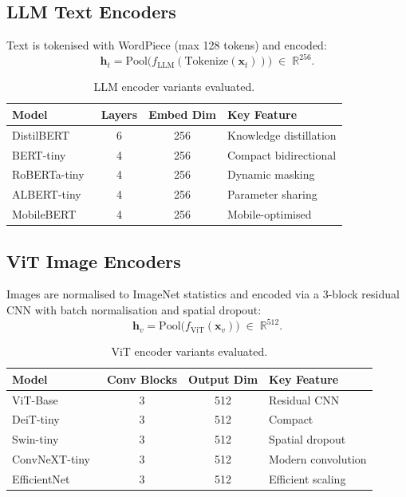 \documentclass[12pt, a4paper, oneside]{Thesis}
\begin{document}
\subsection{LLM Text Encoders}
Text is tokenised with WordPiece \cite{Devlin2019} (max 128 tokens) and encoded:
\[
  \mathbf{h}_t = \mathrm{Pool}\!\bigl(f_{\mathrm{LLM}}(\mathrm{Tokenize}(\mathbf{x}_t))\bigr) \;\in\; \mathbb{R}^{256}.
\]

\begin{table}[H]\centering
\small
\begin{tabular}{lccl}
\toprule
\textbf{Model} & \textbf{Layers} & \textbf{Embed Dim} & \textbf{Key Feature}\\
\midrule
DistilBERT~\cite{Sanh2019}    & 6 & 256 & Knowledge distillation \\
BERT-tiny~\cite{Devlin2019}   & 4 & 256 & Compact bidirectional \\
RoBERTa-tiny~\cite{Liu2019}   & 4 & 256 & Dynamic masking \\
ALBERT-tiny~\cite{Lan2020}    & 4 & 256 & Parameter sharing \\
MobileBERT~\cite{Sun2020}     & 4 & 256 & Mobile-optimised \\
\bottomrule
\end{tabular}
\caption{LLM encoder variants evaluated.}
\label{tab:llmenc}
\end{table}

\subsection{ViT Image Encoders}
Images are normalised to ImageNet statistics \cite{Deng2009} and encoded via a 3-block residual CNN with batch normalisation \cite{IoffeSzegedy2015} and spatial dropout:
\[
  \mathbf{h}_v = \mathrm{Pool}\!\bigl(f_{\mathrm{ViT}}(\mathbf{x}_v)\bigr) \;\in\; \mathbb{R}^{512}.
\]

\begin{table}[H]\centering
\small
\begin{tabular}{lccp{5cm}}
\toprule
\textbf{Model} & \textbf{Conv Blocks} & \textbf{Output Dim} & \textbf{Key Feature}\\
\midrule
ViT-Base~\cite{Dosovitskiy2021}      & 3 & 512 & Residual CNN \\
DeiT-tiny~\cite{Touvron2021}         & 3 & 512 & Compact \\
Swin-tiny~\cite{Liu2021Swin}         & 3 & 512 & Spatial dropout \\
ConvNeXT-tiny~\cite{Liu2022ConvNeXT} & 3 & 512 & Modern convolution \\
EfficientNet~\cite{Tan2019}          & 3 & 512 & Efficient scaling \\
\bottomrule
\end{tabular}
\caption{ViT encoder variants evaluated.}
\label{tab:vitenc}
\end{table}
\end{document}
